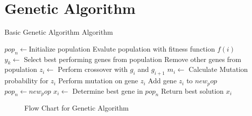\section{Genetic Algorithm}
\begin{algorithm}
\caption{Basic Genetic Algorithm Algorithm}
\label{alg:GA}
	\begin{algorithmic}[1]
		\STATE $pop_n\leftarrow$Initialize population
		\STATE Evalute population with fitness function $f(i)$
		\STATE $y_k \leftarrow$ Select best performing genes from population
		\STATE Remove other genes from population
		\REPEAT
				\STATE $z_i \leftarrow$ Perform crossover with $g_i$ and $g_{i+1}$
				\STATE $m_i\leftarrow$ Calculate Mutation probability for $z_i$
					\STATE Perform mutation on gene $z_i$
				\ENDIF
				\STATE Add gene $z_i$ to $new_pop$
			\ENDFOR
		\STATE $pop_n \leftarrow new_pop$
		\ENDWHILE
		\STATE $x_i \leftarrow$ Determine best gene in $pop_n$
		\STATE Return best solution $x_i$
	\end{algorithmic}
\end{algorithm}
\label{sec:geneticalgorithm}
\begin{figure}[htbp!]
	\begin{center}
	\caption{Flow Chart for Genetic Algorithm}
	\label{fig:GeneticAlgorithmFlowChart}
	\end{center}
\end{figure}
